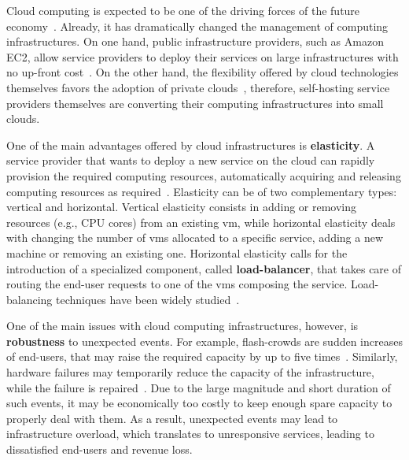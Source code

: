 
Cloud computing is expected to be one of the driving forces of the
future economy~\citep{WPonMckinsey13}. Already, it has dramatically
changed the management of computing infrastructures. On one hand,
public infrastructure providers, such as Amazon EC2, allow service
providers to deploy their services on large infrastructures with no
up-front cost~\citep{Buyya09:FGCS}. On the other hand, the flexibility
offered by cloud technologies themselves favors the adoption of
private clouds~\citep{Gulati11:HotCloud}, therefore, self-hosting
service providers themselves are converting their computing
infrastructures into small clouds.

One of the main advantages offered by cloud infrastructures is {\bf
  elasticity}. A service provider that wants to deploy a new service
on the cloud can rapidly provision the required computing resources,
automatically acquiring and releasing computing resources as
required~\citep{Herbst13:ICAC}.  Elasticity can be of two
complementary types: vertical and horizontal. Vertical elasticity
consists in adding or removing resources (e.g., CPU cores) from an
existing \ac{vm}, while horizontal elasticity deals with changing the
number of \acp{vm} allocated to a specific service, adding a new
machine or removing an existing one.
%
Horizontal elasticity calls for the introduction of a specialized
component, called {\bf load-balancer}, that takes care of routing the
end-user requests to one of the \acp{vm} composing the
service. Load-balancing techniques have been widely
studied~\citep{Barroso09,Lu11:PerfEval,Lin12:IGCC,BeesBased:ADAPTIVE}.

One of the main issues with cloud computing infrastructures, however,
is {\bf robustness} to unexpected events. For example, flash-crowds
are sudden increases of end-users, that may raise the required
capacity by up to five times~\citep{Bodik10:SoCC}. Similarly, hardware
failures may temporarily reduce the capacity of the infrastructure,
while the failure is repaired~\citep{Barroso09}. Due to the large
magnitude and short duration of such events, it may be economically
too costly to keep enough spare capacity to properly deal with
them. As a result, unexpected events may lead to infrastructure
overload, which translates to unresponsive services, leading to
dissatisfied end-users and revenue loss.

